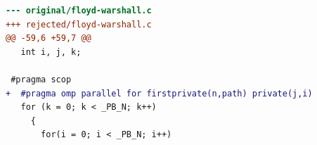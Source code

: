 \begin{lstlisting}[language=diff,basicstyle=\ttfamily\scriptsize,breaklines=true,caption={polybench/floyd-warshall — attempt 2 of 3, rejected by the gate at 'tsan': Race detected: / WARNING: ThreadSanitizer: data race (pid=3289105)}]
--- original/floyd-warshall.c
+++ rejected/floyd-warshall.c
@@ -59,6 +59,7 @@
   int i, j, k;
 
 #pragma scop
+  #pragma omp parallel for firstprivate(n,path) private(j,i) 
   for (k = 0; k < _PB_N; k++)
     {
       for(i = 0; i < _PB_N; i++)
\end{lstlisting}
